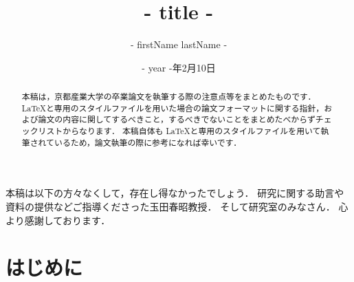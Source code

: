 \documentclass[jlreq,12pt,twoside]{jsreport}
\title{ {{- title -}} }
\author{ {{- firstName}}  {{lastName -}} }
\date{ {{- year -}}年2月10日}
\begin{document}

\maketitle


\begin{abstract}

本稿は，京都産業大学の卒業論文を執筆する際の注意点等をまとめたものです．
\LaTeX と専用のスタイルファイルを用いた場合の論文フォーマットに関する指針，および論文の内容に関してするべきこと，するべきでないことをまとめたべからずチェックリストからなります．
本稿自体も \LaTeX と専用のスタイルファイルを用いて執筆されているため，論文執筆の際に参考になれば幸いです．
\end{abstract}

\begin{acknowledgments}

本稿は以下の方々なくして，存在し得なかったでしょう．
研究に関する助言や資料の提供などご指導くださった玉田春昭教授．
そして研究室のみなさん．
心より感謝しております．



\end{acknowledgments}


\tableofcontents       %

%
%

\listoffigures         %
\listoftables          %


%
%
%
\chapter{はじめに}
\end{document}
